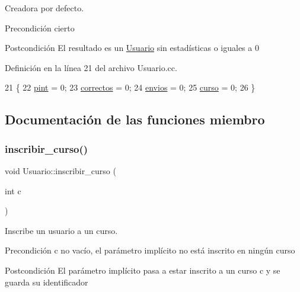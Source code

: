 Creadora por defecto. 

\begin{DoxyPrecond}{Precondición}
cierto 
\end{DoxyPrecond}
\begin{DoxyPostcond}{Postcondición}
El resultado es un \mbox{\hyperlink{class_usuario}{Usuario}} sin estadísticas o iguales a 0 
\end{DoxyPostcond}


Definición en la línea 21 del archivo Usuario.\+cc.


\begin{DoxyCode}
21                        \{
22         \mbox{\hyperlink{class_usuario_adff16a149798e94b0747e7dc1bd85107}{pint}} = 0;
23         \mbox{\hyperlink{class_usuario_a6d7fd52e0625b61d324922bf4783435e}{correctos}} = 0;
24         \mbox{\hyperlink{class_usuario_a485a741c0646e6414bd6cf669a77fc9c}{envios}} = 0;
25         \mbox{\hyperlink{class_usuario_aa767fe2d1198f2c97791073bc55803e7}{curso}} = 0;
26       \}
\end{DoxyCode}


\subsection{Documentación de las funciones miembro}
\mbox{\label{class_usuario_a1410eee3a91f3affc43eb562512bcfb0}} 
\subsubsection{\texorpdfstring{inscribir\+\_\+curso()}{inscribir\_curso()}}
{\footnotesize\ttfamily void Usuario\+::inscribir\+\_\+curso (\begin{DoxyParamCaption}\item[{int}]{c }\end{DoxyParamCaption})}



Inscribe un usuario a un curso. 

\begin{DoxyPrecond}{Precondición}
c no vacío, el parámetro implícito no está inscrito en ningún curso 
\end{DoxyPrecond}
\begin{DoxyPostcond}{Postcondición}
El parámetro implícito pasa a estar inscrito a un curso c y se guarda su identificador 
\end{DoxyPostcond}


